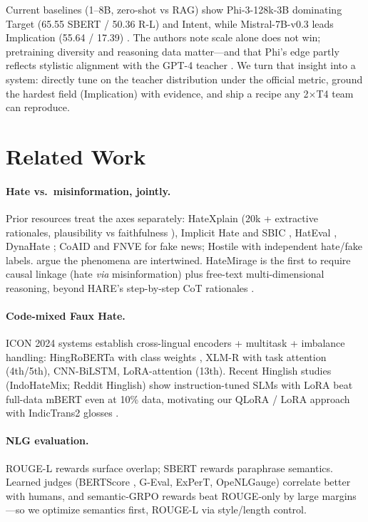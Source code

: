 \documentclass[11pt]{article}
\begin{document}
Current baselines (1--8B, zero-shot vs RAG) show Phi-3-128k-3B dominating Target (65.55 SBERT / 50.36 R-L) and Intent, while Mistral-7B-v0.3 leads Implication (55.64 / 17.39) \cite{kasu2026hatemirage}.
The authors note scale alone does not win; pretraining diversity and reasoning data matter---and that Phi's edge partly reflects stylistic alignment with the GPT-4 teacher \cite{achiam2023gpt4}.
We turn that insight into a system: directly tune on the teacher distribution under the official metric, ground the hardest field (Implication) with evidence, and ship a recipe any 2$\times$T4 team can reproduce.

\section{Related Work}
\paragraph{Hate vs.\ misinformation, jointly.}
Prior resources treat the axes separately: HateXplain \cite{mathew2021hatexplain} (20k + extractive rationales, plausibility vs faithfulness \cite{deyoung2020eraser}), Implicit Hate \cite{elsherief2021latent} and SBIC \cite{sap2020social}, HatEval \cite{basile2019semeval}, DynaHate \cite{vidgen2020dynahate}; CoAID \cite{cui2020coaid} and FNVE for fake news; Hostile \cite{bhardwaj2020hostility} with independent hate/fake labels.
\citet{mosleh2024pnas} argue the phenomena are intertwined.
HateMirage is the first to require causal linkage (hate \emph{via} misinformation) plus free-text multi-dimensional reasoning, beyond HARE's step-by-step CoT rationales \cite{kim2023hare}.

\paragraph{Code-mixed Faux Hate.}
ICON 2024 systems establish cross-lingual encoders + multitask + imbalance handling: HingRoBERTa with class weights \cite{fondekar2024unpacking}, XLM-R with task attention (4th/5th), CNN-BiLSTM, LoRA-attention (13th).
Recent Hinglish studies (IndoHateMix; Reddit Hinglish) show instruction-tuned SLMs with LoRA beat full-data mBERT even at 10\% data, motivating our QLoRA \cite{dettmers2023qlora} / LoRA \cite{hu2022lora} approach with IndicTrans2 glosses \cite{gala2023indictrans}.

\paragraph{NLG evaluation.}
ROUGE-L rewards surface overlap; SBERT rewards paraphrase semantics.
Learned judges (BERTScore \cite{zhang2020bertscore}, G-Eval, ExPerT, OpeNLGauge) correlate better with humans, and semantic-GRPO rewards beat ROUGE-only by large margins---so we optimize semantics first, ROUGE-L via style/length control.
\end{document}
